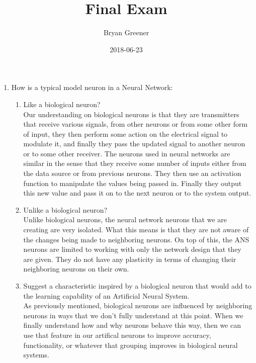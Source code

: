 \documentclass[notitlepage]{report}
\title{Final Exam}
\author{Bryan Greener}
\date{2018-06-23}
\theoremstyle{plain} %
\theoremstyle{definition} %
\theoremstyle{plain} %
\begin{document}
\maketitle
\begin{enumerate}
\item How is a typical model neuron in a Neural Network:
	\begin{enumerate}
	\item Like a biological neuron?
	\medskip\\
		Our understanding on biological neurons is that they are transmitters that receive various signals, from other neurons or from some other form of input, they then perform some action on the electrical signal to modulate it, and finally they pass the updated signal to another neuron or to some other receiver. The neurons used in neural networks are similar in the sense that they receive some number of inputs either from the data source or from previous neurons. They then use an activation function to manipulate the values being passed in. Finally they output this new value and pass it on to the next neuron or to the system output.
	\item Unlike a biological neuron?
	\medskip\\
		Unlike biological neurons, the neural network neurons that we are creating are very isolated. What this means is that they are not aware of the changes being made to neighboring neurons. On top of this, the ANS neurons are limited to working with only the network design that they are given. They do not have any plasticity in terms of changing their neighboring neurons on their own.
	\item Suggest a characteristic inspired by a biological neuron that would add to the learning capability of an Artificial Neural System.
	\medskip\\
		As previously mentioned, biological neurons are influenced by neighboring neurons in ways that we don't fully understand at this point. When we finally understand how and why neurons behave this way, then we can use that feature in our artifical neurons to improve accuracy, functionality, or whatever that grouping improves in biological neural systems.
	\end{enumerate}


\end{enumerate}
\end{document}
